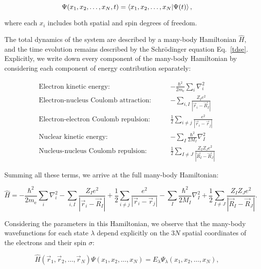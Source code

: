 \begin{equation}
    \Psi(x_1,x_2,\dots,x_N,t)=\braket{x_1,x_2,\dots,x_N|\Psi(t)},
    \label{many-body_wavefunction}
\end{equation}

where each $x_i$ includes both spatial and spin degrees of freedom.

The total dynamics of the system are described by a many-body Hamiltonian $\hat{H}$, and the time evolution remains described by the Schrödinger equation Eq.~\eqref{tdse}. Explicitly, we write down every component of the many-body Hamiltonian by considering each component of energy contribution separately:

\begin{align}
\text{Electron kinetic energy:}\qquad & -\frac{\hbar^2}{2m_\mathrm{e}}\sum_i\nabla_i^2 \label{electrons_kinetic}\\
\text{Electron-nucleus Coulomb attraction:}\qquad & -\sum_{i,I}\frac{Z_I e^2}{|\vec{r}_i-\vec{R}_I|} \label{electrons_nucleus_Coulomb}\\
\text{Electron-electron Coulomb repulsion:}\qquad & \frac{1}{2}\sum_{i\neq j}\frac{e^2}{|\vec{r}_i-\vec{r}_j|} \label{electrons_Coulomb}\\
\text{Nuclear kinetic energy:}\qquad & -\sum_I\frac{\hbar^2}{2M_I}\nabla_I^2 \label{nucleus_kinetic}\\
\text{Nucleus-nucleus Coulomb repulsion:}\qquad & \frac{1}{2}\sum_{I\neq J}\frac{Z_I Z_J e^2}{|\vec{R}_I-\vec{R}_J|} \label{nucleus_interaction}
\end{align}

Summing all these terms, we arrive at the full many-body Hamiltonian:

\begin{equation}
    \hat{H}=-\frac{\hbar^2}{2m_\mathrm{e}}\sum_i\nabla_i^2
    -\sum_{i,I}\frac{Z_I e^2}{|\vec{r}_i-\vec{R}_I|}
    +\frac{1}{2}\sum_{i\neq j}\frac{e^2}{|\vec{r}_i-\vec{r}_j|}
    -\sum_I\frac{\hbar^2}{2M_I}\nabla_I^2
    +\frac{1}{2}\sum_{I\neq J}\frac{Z_I Z_J e^2}{|\vec{R}_I-\vec{R}_J|}.
    \label{full_many_body_hamiltonian}
\end{equation}

Considering the parameters in this Hamiltonian, we observe that the many-body wavefunctions for each state $\lambda$ depend explicitly on the $3N$ spatial coordinates of the electrons and their spin $\sigma$:

\begin{equation}
    \hat{H}(\vec{r}_1,\vec{r}_2,\dots,\vec{r}_N)\Psi(x_1,x_2,\dots,x_N)
    = E_\lambda\Psi_\lambda(x_1,x_2,\dots,x_N),
    \label{many_body_hamiltonian_argument}
\end{equation}

